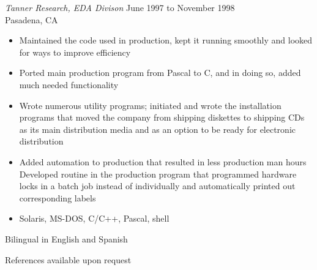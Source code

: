 \documentclass{res}
\begin{document}
\begin{resume}
{\sl Tanner Research, EDA Divison} \hfill June 1997 to November 1998\\
Pasadena, CA
\begin{itemize}
\item Maintained the code used in production, kept it running
smoothly and looked for ways to improve efficiency
\item Ported main production program from Pascal to C, and in doing
so, added much needed functionality
\item Wrote numerous utility programs; initiated and wrote the
installation programs that moved the company from shipping diskettes
to shipping CDs as its main distribution media and as an option to
be ready for electronic distribution
\item Added automation to production that resulted in less production
man hours Developed routine in the production program that programmed
hardware locks in a batch job instead of individually and automatically
printed out corresponding labels
\item  Solaris, MS-DOS, C/C++, Pascal, shell
\end{itemize}

Bilingual in English and Spanish

References available upon request

\end{resume}
\end{document}
